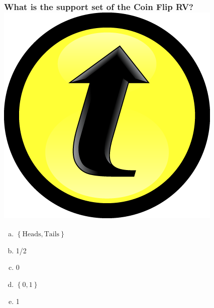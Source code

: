\documentclass[handout]{beamer}
\begin{document}
\begin{frame}
  \frametitle{What is the support set of the Coin Flip RV?\hfill\includegraphics[scale = 0.05]{./images/clicker}}
  \begin{enumerate}[(a)]
    \item $\left\{ \mbox{Heads}, \mbox{Tails} \right\}$ 
    \item 1/2 
    \item 0 
    \item $\left\{ 0,1 \right\}$
    \item 1
  \end{enumerate}
\end{frame}
\end{document}
